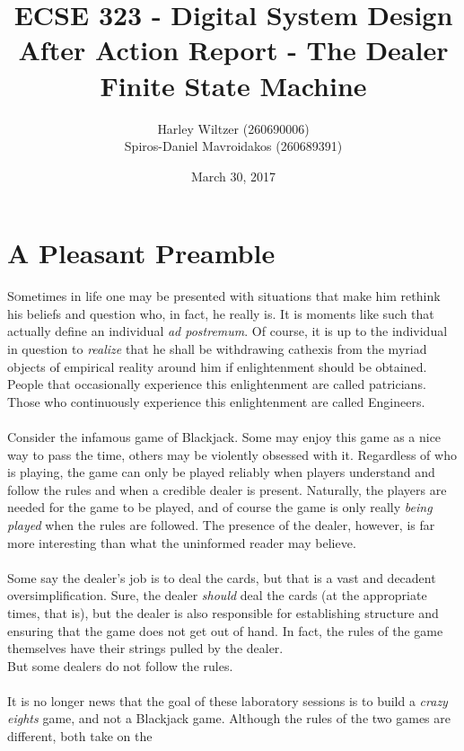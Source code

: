 \documentclass[12pt]{report}
\title{ECSE 323 - Digital System Design\\After Action Report - The Dealer Finite State Machine}
\author{Harley Wiltzer (260690006)\\Spiros-Daniel Mavroidakos (260689391)}
\date{March 30, 2017}
\begin{document}
\maketitle
\newpage
\pagestyle{fancy}
\fancyhf{}
\tableofcontents

\part{A Pleasant Preamble}
\label{s:preamble}
\lettrine{S}ometimes in life one may be presented with situations that make him rethink his beliefs and
question who, in fact, he really is. It is moments like such that actually define an individual
\textit{ad postremum}. Of course, it is up to the individual in question to \textit{realize} that he shall be
withdrawing cathexis from the myriad objects of empirical reality around him if enlightenment should
be obtained. People that occasionally experience this enlightenment are called patricians. Those who
continuously experience this enlightenment are called Engineers.\\\\
Consider the infamous game of Blackjack. Some may enjoy this game as a nice way to pass the time,
others may be violently obsessed with it. Regardless of who is playing, the game can only be played
reliably when players understand and follow the rules and when a credible dealer is present.
Naturally, the players are needed for the game to be played, and of course the game is only really
\textit{being played} when the rules are followed. The presence of the dealer, however, is far more
interesting than what the uninformed reader may believe.\\\\
Some say the dealer's job is to deal the cards, but that is a vast and decadent oversimplification.
Sure, the dealer \textit{should} deal the cards (at the appropriate times, that is), but the dealer
is also responsible for establishing structure and ensuring that the game does not get out of hand.
In fact, the rules of the game themselves have their strings pulled by the dealer. \\But some dealers
do not follow the rules.\\\\
It is no longer news that the goal of these laboratory sessions is to build a \textit{crazy eights}
game, and not a Blackjack game. Although the rules of the two games are different, both take on the
\end{document}
